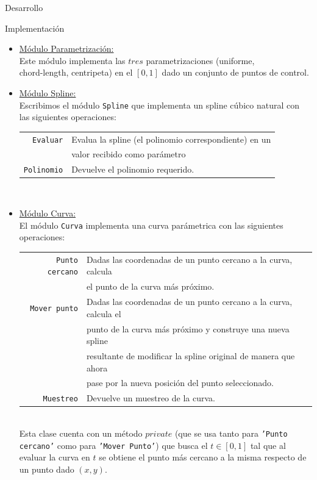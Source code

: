 \begin{section}{Desarrollo}
\begin{subsection}{Implementación}
		\begin{itemize}
			\item \underline{Módulo Parametrización:}\\
				Este módulo implementa las $tres$ parametrizaciones (uniforme,\\
				chord-length, centripeta) en el $[0,1]$ dado un conjunto de puntos de control.
		
			\item \underline{Módulo Spline:}\\
				Escribimos el módulo \texttt{Spline} que implementa un spline cúbico natural con las siguientes operaciones:\\
				
				\begin{tabular}{rl}
					\texttt{Evaluar} & Evalua la spline (el polinomio correspondiente) en un\\
									 & valor recibido como parámetro\\
					\texttt{Polinomio} & Devuelve el polinomio requerido.\\
				\end{tabular}\\

			\item \underline{Módulo Curva:}\\
				El módulo \texttt{Curva} implementa una curva parámetrica con las siguientes operaciones:\\
				
				\begin{tabular}{rl}
					\texttt{Punto cercano} & Dadas las coordenadas de un punto cercano a la curva, calcula\\
										   & el punto de la curva más próximo.\\
					\texttt{Mover punto} & Dadas las coordenadas de un punto cercano a la curva, calcula el\\
										 & punto de la curva más próximo y construye una nueva spline\\
										 & resultante de modificar la spline original de manera que ahora\\
										 & pase por la nueva posición del punto seleccionado.\\
					\texttt{Muestreo} & Devuelve un muestreo de la curva.\\
				\end{tabular}\\
				
				Esta clase cuenta con un método $private$ (que se usa tanto para \texttt{'Punto cercano'} como para \texttt{'Mover Punto'}) que busca el $t \in [0,1]$ tal que al evaluar la curva en $t$ se obtiene el punto más cercano a la misma respecto de un punto dado $(x,y)$.
				

\end{itemize}
\end{subsection}
\end{section}
